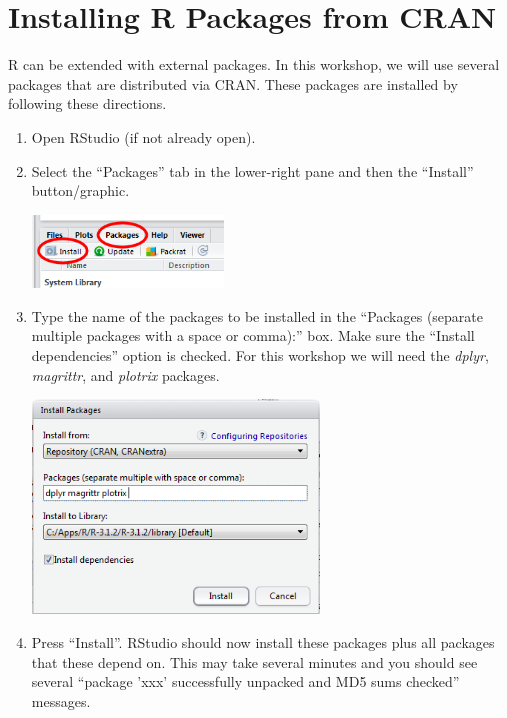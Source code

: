 \documentclass{article}\usepackage[]{graphicx}\usepackage[]{color}
\begin{document}
\newpage
\section{Installing R Packages from CRAN}
R can be extended with external packages.  In this workshop, we will use several packages that are distributed via CRAN.  These packages are installed by following these directions.
\begin{enumerate}
  \item Open RStudio (if not already open).

  \item Select the ``Packages'' tab in the lower-right pane and then the ``Install'' button/graphic.
\begin{center}
  \includegraphics[width=2in]{Figs/RStudio_Prep_InstallPkgs_Icons.png}
\end{center}

  \item Type the name of the packages to be installed in the ``Packages (separate multiple packages with a space or comma):'' box.  Make sure the ``Install dependencies'' option is checked.  For this workshop we will need the \textit{dplyr}, \textit{magrittr}, and \textit{plotrix} packages.
\begin{center}
  \includegraphics[width=3in]{Figs/RStudio_Prep_InstallPkgs_Choose.png}
\end{center}
  \item Press ``Install''.  RStudio should now install these packages plus all packages that these depend on.  This may take several minutes and you should see several ``package 'xxx' successfully unpacked and MD5 sums checked'' messages.
\end{enumerate}
\end{document}

